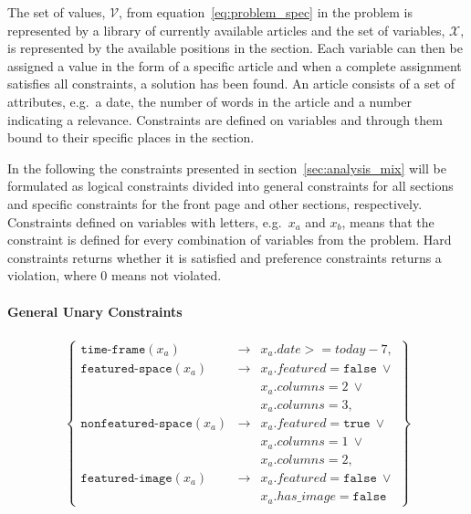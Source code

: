 The set of values, $\mathcal{V}$, from equation~\vref{eq:problem_spec} in the problem is represented by a library of currently available articles and the set of variables, $\mathcal{X}$, is represented by the available positions in the section. Each variable can then be assigned a value in the form of a specific article and when a complete assignment satisfies all constraints, a solution has been found. An article consists of a set of attributes, e.g.\ a date, the number of words in the article and a number indicating a relevance. Constraints are defined on variables and through them bound to their specific places in the section.

In the following the constraints presented in section~\vref{sec:analysis_mix} will be formulated as logical constraints divided into general constraints for all sections and specific constraints for the front page and other sections, respectively. Constraints defined on variables with letters, e.g.\ $x_a$ and $x_b$, means that the constraint is defined for every combination of variables from the problem. Hard constraints returns whether it is satisfied and preference constraints returns a violation, where $0$ means not violated.

\paragraph{General Unary Constraints}
\begin{align}
	\begin{Bmatrix}
		\texttt{time-frame}(x_a) &\rightarrow& x_a.date >= today-7,\\
		\texttt{featured-space}(x_a) &\rightarrow& x_a.featured = \texttt{false}\ \vee\\
			&&x_a.columns = 2\ \vee\\
			&&x_a.columns = 3,\\
		\texttt{nonfeatured-space}(x_a) &\rightarrow& x_a.featured = \texttt{true}\ \vee\\
			&&x_a.columns = 1\ \vee\\
			&&x_a.columns = 2,\\
		\texttt{featured-image}(x_a) &\rightarrow& x_a.featured = \texttt{false}\ \vee\\
			&&x_a.has\_image = \texttt{false}
	\end{Bmatrix}
\end{align}

